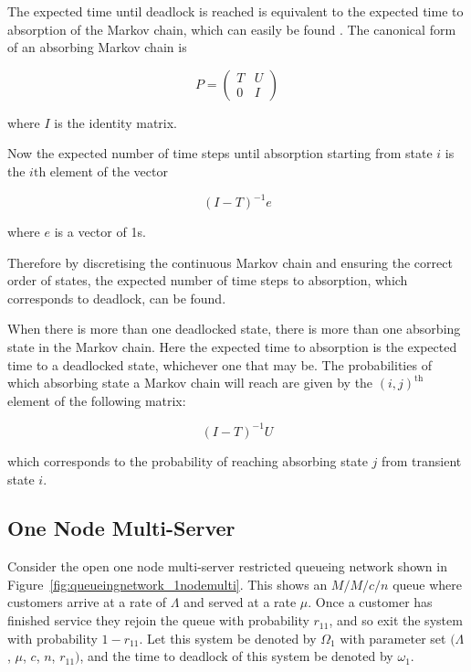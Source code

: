 \documentclass{article}
\numberwithin{equation}{section}
\begin{document}
The expected time until deadlock is reached is equivalent to the expected time to absorption of the Markov chain, which can easily be found \cite{stewart09}.
The canonical form of an absorbing Markov chain is

\begin{equation*}
P = \left(\begin{array}{cc} T & U\\ 0 & I \end{array} \right)
\end{equation*}

where $I$ is the identity matrix.

Now the expected number of time steps until absorption starting from state $i$ is the $i\text{th}$ element of the vector

\begin{equation} \label{eq:abs_probs}
  (I - T)^{-1}e
\end{equation}

where $e$ is a vector of 1s.

Therefore by discretising the continuous Markov chain and ensuring the correct order of states, the expected number of time steps to absorption, which corresponds to deadlock, can be found.

When there is more than one deadlocked state, there is more than one absorbing state in the Markov chain.
Here the expected time to absorption is the expected time to a deadlocked state, whichever one that may be.
The probabilities of which absorbing state a Markov chain will reach are given by the $(i, j)^{\text{th}}$ element of the following matrix:

\begin{equation}
  (I - T)^{-1}U
\end{equation}

which corresponds to the probability of reaching absorbing state $j$ from transient state $i$.


\subsection{One Node Multi-Server}\label{sec:1nodeMS}


Consider the open one node multi-server restricted queueing network shown in Figure~\ref{fig:queueingnetwork_1nodemulti}.
This shows an \(M/M/c/n\) queue where customers arrive at a rate of $\Lambda$ and served at a rate $\mu$.
Once a customer has finished service they rejoin the queue with probability $r_{11}$, and so exit the system with probability $1 - r_{11}$.
Let this system be denoted by $\Omega_1$ with parameter set $(\Lambda$, $\mu$, $c$, $n$, $r_{11})$, and the time to deadlock of this system be denoted by $\omega_1$.
\end{document}
